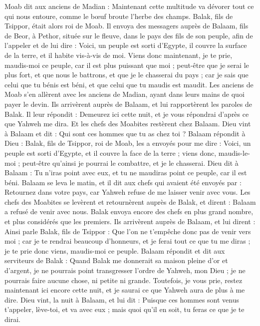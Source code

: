 \begin{multicols}{2}
Moab dit aux anciens de Madian : Maintenant cette multitude va dévorer tout ce qui nous entoure, comme le bœuf broute l'herbe des champs. Balak, fils de Tsippor, était alors roi de Moab.
Il envoya des messagers auprès de Balaam, fils de Beor, à Pethor, située sur le fleuve, dans le pays des fils de son peuple, afin de l'appeler et de lui dire : Voici, un peuple est sorti d'Egypte, il couvre la surface de la terre, et il habite vis-à-vis de moi.
Viens donc maintenant, je te prie, maudis-moi ce peuple, car il est plus puissant que moi ; peut-être que je serai le plus fort, et que nous le battrons, et que je le chasserai du pays ; car je sais que celui que tu bénis est béni, et que celui que tu maudis est maudit.
Les anciens de Moab s'en allèrent avec les anciens de Madian, ayant dans leurs mains de quoi payer le devin. Ils arrivèrent auprès de Balaam, et lui rapportèrent les paroles de Balak.
Il leur répondit : Demeurez ici cette nuit, et je vous répondrai d’après ce que Yahweh me dira. Et les chefs des Moabites restèrent chez Balaam.
Dieu vint à Balaam et dit : Qui sont ces hommes que tu as chez toi ?
Balaam répondit à Dieu : Balak, fils de Tsippor, roi de Moab, les a envoyés pour me dire :
Voici, un peuple est sorti d'Egypte, et il couvre la face de la terre ; viens donc, maudis-le-moi ; peut-être qu’ainsi je pourrai le combattre, et je le chasserai.
Dieu dit à Balaam : Tu n'iras point avec eux, et tu ne maudiras point ce peuple, car il est béni.
Balaam se leva le matin, et il dit aux chefs qui avaient été envoyés par : Retournez dans votre pays, car Yahweh refuse de me laisser venir avec vous.
Les chefs des Moabites se levèrent et retournèrent auprès de Balak, et dirent : Balaam a refusé de venir avec nous.
Balak envoya encore des chefs en plus grand nombre, et plus considérés que les premiers.
Ils arrivèrent auprès de Balaam, et lui dirent : Ainsi parle Balak, fils de Tsippor : Que l’on ne t’empêche donc pas de venir vers moi ;
car je te rendrai beaucoup d’honneurs, et je ferai tout ce que tu me diras ; je te prie donc viens, maudis-moi ce peuple.
Balaam répondit et dit aux serviteurs de Balak : Quand Balak me donnerait sa maison pleine d'or et d'argent, je ne pourrais point transgresser l’ordre de Yahweh, mon Dieu ; je ne pourrais faire aucune chose, ni petite ni grande.
Toutefois, je vous prie, restez maintenant ici encore cette nuit, et je saurai ce que Yahweh aura de plus à me dire.
Dieu vint, la nuit à Balaam, et lui dit : Puisque ces hommes sont venus t'appeler, lève-toi, et va avec eux ; mais quoi qu'il en soit, tu feras ce que je te dirai.

\end{multicols}
